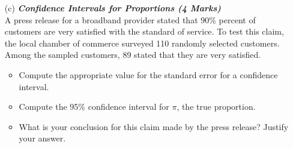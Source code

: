 \documentclass[]{article}
\begin{document}
\begin{itemize}
\item[(c)] \textbf{\textit{Confidence Intervals for Proportions (4 Marks)}}\\
A press release for a broadband provider stated that $90\%$ percent of customers are very satisfied
with the standard of service. To test this claim, the local chamber of commerce surveyed 110 randomly selected customers. Among the sampled customers, 89 stated that they are very satisfied.





\begin{itemize}
\item  Compute the appropriate value for the standard error for a confidence interval.
\item  Compute the 95\% confidence interval for $\pi$, the true proportion.
\item  What is your conclusion for this claim made by the press release? Justify your answer.
\end{itemize}
\end{itemize}
\end{document}
